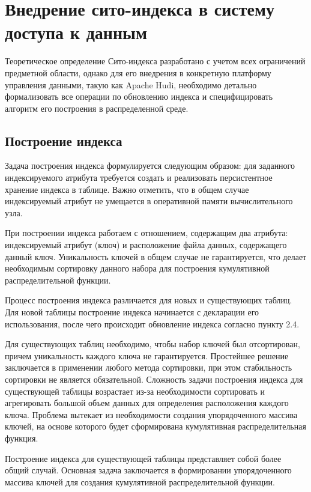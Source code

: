 \section{Внедрение сито-индекса в систему доступа к данным}
Теоретическое определение Сито-индекса разработано с учетом всех ограничений предметной области, однако для его внедрения в конкретную платформу управления данными, такую как Apache Hudi, необходимо детально формализовать все операции по обновлению индекса и специфицировать алгоритм его построения в распределенной среде.


\subsection{Построение индекса}

Задача построения индекса формулируется следующим образом: для заданного индексируемого атрибута требуется создать и реализовать персистентное хранение индекса в таблице. Важно отметить, что в общем случае индексируемый атрибут не умещается в оперативной памяти вычислительного узла.

При построении индекса работаем с отношением, содержащим два атрибута: индексируемый атрибут (ключ) и расположение файла данных, содержащего данный ключ. Уникальность ключей в общем случае не гарантируется, что делает необходимым сортировку данного набора для построения кумулятивной распределительной функции.

Процесс построения индекса различается для новых и существующих таблиц. Для новой таблицы построение индекса начинается с декларации его использования, после чего происходит обновление индекса согласно пункту 2.4.

Для существующих таблиц необходимо, чтобы набор ключей был отсортирован, причем уникальность каждого ключа не гарантируется. Простейшее решение заключается в применении любого метода сортировки, при этом стабильность сортировки не является обязательной. Сложность задачи построения индекса для существующей таблицы возрастает из-за необходимости сортировать и агрегировать большой объем данных для определения расположения каждого ключа. Проблема вытекает из необходимости создания упорядоченного массива ключей, на основе которого будет сформирована кумулятивная распределительная функция.

Построение индекса для существующей таблицы представляет собой более общий случай. Основная задача заключается в формировании упорядоченного массива ключей для создания кумулятивной распределительной функции.

